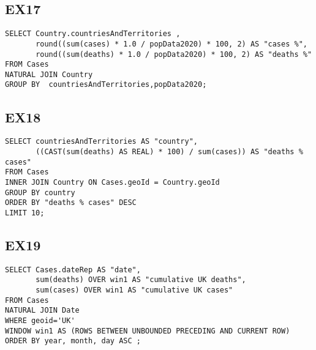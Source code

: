 \documentclass[]{article}
\begin{document}
\subsection{EX17}
\begin{verbatim}
SELECT Country.countriesAndTerritories ,
       round((sum(cases) * 1.0 / popData2020) * 100, 2) AS "cases %",
       round((sum(deaths) * 1.0 / popData2020) * 100, 2) AS "deaths %"
FROM Cases
NATURAL JOIN Country
GROUP BY  countriesAndTerritories,popData2020;
\end{verbatim}

\subsection{EX18}
\begin{verbatim}
SELECT countriesAndTerritories AS "country",
       ((CAST(sum(deaths) AS REAL) * 100) / sum(cases)) AS "deaths % cases"
FROM Cases
INNER JOIN Country ON Cases.geoId = Country.geoId
GROUP BY country
ORDER BY "deaths % cases" DESC
LIMIT 10;
\end{verbatim}

\subsection{EX19}
\begin{verbatim}
SELECT Cases.dateRep AS "date",
       sum(deaths) OVER win1 AS "cumulative UK deaths",
       sum(cases) OVER win1 AS "cumulative UK cases"
FROM Cases
NATURAL JOIN Date
WHERE geoid='UK'
WINDOW win1 AS (ROWS BETWEEN UNBOUNDED PRECEDING AND CURRENT ROW)
ORDER BY year, month, day ASC ;
\end{verbatim}
\end{document}
